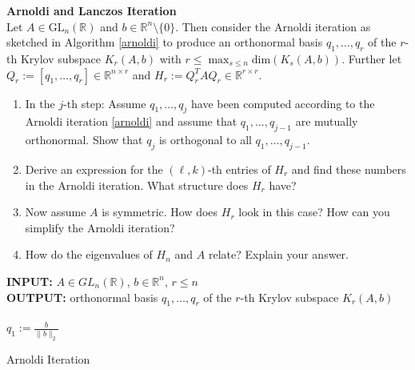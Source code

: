\textbf{Arnoldi and Lanczos Iteration}\\
Let $A\in \text{GL}_n(\mathbb{R})$ and $b\in\mathbb{R}^n\setminus \{0\}$. Then consider the Arnoldi iteration as sketched in Algorithm \ref{arnoldi} to produce an orthonormal basis $q_1,\ldots, q_r$ of the $r$-th Krylov subspace $K_r(A,b)$ with $r \leq \max_{s\leq n} \text{dim}(K_s(A,b))$. Further let $Q_r := [q_1,\ldots, q_{r}] \in \mathbb{R}^{n \times r}$ and $H_r := Q_r^TAQ_r \in \mathbb{R}^{r\times r}$.
\begin{enumerate}
	\item In the $j$-th step: Assume $q_1,\ldots, q_{j}$ have been computed according to the Arnoldi iteration \ref{arnoldi} and assume that $q_1,\ldots, q_{j-1}$ are mutually orthonormal. Show that $q_j$ is orthogonal to all $q_1,\ldots, q_{j-1}$.
	\item Derive an expression for the $(\ell,k)$-th entries of $H_r$ and find these numbers in the Arnoldi iteration. What structure does $H_r$ have?
	\item Now assume $A$ is symmetric. How does $H_r$ look in this case? How can you simplify the Arnoldi iteration?
	\item How do the eigenvalues of $H_n$ and $A$ relate? Explain your answer.
\end{enumerate}
%
\begin{algorithm}
		\textbf{INPUT:} $A\in GL_n(\mathbb{R})$, $b \in \mathbb{R}^n$, $r\leq n$\\
	\textbf{OUTPUT:} orthonormal basis $q_1,\ldots, q_r$ of the $r$-th Krylov subspace $K_r(A,b)$\\~\\
	$q_1 := \frac{b}{\|b\|_2}$\\

\caption{Arnoldi Iteration}
\label{arnoldi}
\end{algorithm}	